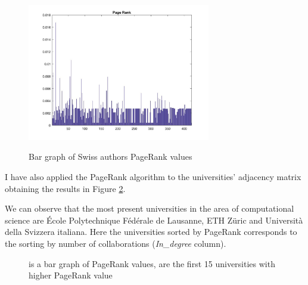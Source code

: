 \documentclass[]{usiinfbachelorproject}
\begin{document}
\begin{figure}[bt]
	\centering
	\includegraphics[height=6cm]{img/Analysis/page_rank_bars.jpg}
	\label{fig:PRbars}
	\caption{ Bar graph of Swiss authors PageRank values}
\end{figure}


I have also applied the PageRank algorithm to the universities' adjacency matrix obtaining the results in Figure \ref{fig:PRUniversities}.

We can observe that the most present universities in the area of computational science are \'{E}cole Polytechnique F\'{e}d\'{e}rale de Lausanne, ETH Z\"{u}ric and Universit\`{a} della Svizzera italiana. Here the universities sorted by PageRank corresponds to the  sorting by number of collaborations (\textit{In\_degree} column).
\begin{figure}[tb]
	\centering
	\caption{  is a bar graph of PageRank values,  are the first 15 universities with higher PageRank value}
	\label{fig:PRUniversities}
\end{figure}
\end{document}
